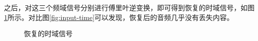 \documentclass{article}
\begin{document}
之后，对这三个频域信号分别进行傅里叶逆变换，即可得到恢复的时域信号，如图\ref{fig:recover-time}所示。对比图\ref{fig:input-time}可以发现，恢复后的音频几乎没有丢失内容。
\begin{figure}[htbp]
\centering
{}
\caption{恢复的时域信号}
\label{fig:recover-time}

\end{figure}
\end{document}
